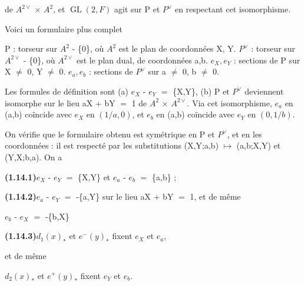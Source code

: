 \documentclass[10pt,a4paper]{article}
\begin{document}
\clearpage
{}
\label{d035-physical-013}
\par de $A^{2\vee{}}$ $\times{}$ $A^2$, et $\operatorname{GL}(2,F)$ agit sur P et $P^\vee{}$ en respectant cet isomorphisme.\par
\par Voici un formulaire plus complet\par
\par\medskip{}\par\smallskip
\par P : torseur sur $A^2$ - \{0\}, où $A^2$ est le plan de coordonnées X, Y. $P^\vee{}$ : torseur sur $A^{2\vee{}}$ - \{0\}, où $A^{2\vee{}}$ est le plan dual, de coordonnées a,b. $e_X,e_Y$ : sections de P sur X $\ne{}$ 0, Y $\ne{}$ 0. $e_a,e_b$ : sections de $P^\vee{}$ sur a $\ne{}$ 0, b $\ne{}$ 0.\par
\par Les formules de définition sont (a) $e_X$ - $e_Y$ $=$ \{X,Y\}, (b) P et $P^\vee{}$ deviennent isomorphe sur le lieu aX + bY $=$ 1 de $A^2$ $\times{}$ $A^{2\vee{}}$. Via cet isomorphisme, $e_a$ en (a,b) coïncide avec $e_X$ en $(1/a,0)$, et $e_b$ en (a,b) coïncide avec $e_Y$ en $(0,1/b)$.\par
\par On vérifie que le formulaire obtenu est symétrique en P et $P^\vee{}$, et en les coordonnées : il est respecté par les substitutions (X,Y;a,b) $\mapsto{}$ (a,b;X,Y) et (Y,X;b,a). On a\par
\par\noindent\textbf{(1.14.1)}\quad $e_X$ - $e_Y$ $=$ \{X,Y\} et $e_a$ - $e_b$ $=$ \{a,b\} ;\par
\par\noindent\textbf{(1.14.2)}\quad $e_a$ - $e_Y$ $=$ -\{a,Y\} sur le lieu aX + bY $=$ 1, et de même\par
\par\smallskip\begin{center}\begin{minipage}{0.96\textwidth}\centering
$e_b$ - $e_X$ $=$ -\{b,X\}
\end{minipage}\end{center}\smallskip
\par\noindent\textbf{(1.14.3)}\quad $d_1(x)_*$ et $e^-(y)_*$ fixent $e_X$ et $e_a$,\par
\par et de même\par
\par\smallskip\begin{center}\begin{minipage}{0.96\textwidth}\centering
$d_2(x)_*$ et $e^+(y)_*$ fixent $e_Y$ et $e_b$.
\end{minipage}\end{center}\smallskip
\end{document}
